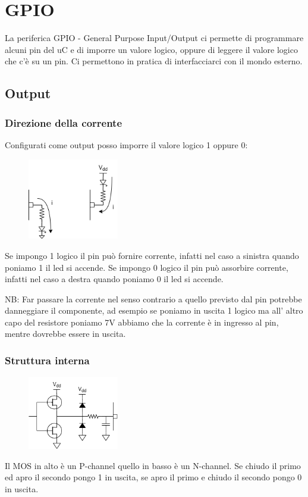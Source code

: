 \section{GPIO}
La periferica GPIO - General Purpose Input/Output ci permette di programmare alcuni pin del uC e di imporre un valore logico, oppure di leggere il valore logico che c'è su un pin.
Ci permettono in pratica di interfacciarci con il mondo esterno.

\subsection{Output}
\subsubsection{Direzione della corrente}
Configurati come output posso imporre il valore logico 1 oppure 0:
\begin{figure}[H]
    \centering
    \includegraphics[width=150px]{images/21_GPIO/gpio_output_current.png}
\end{figure}
Se impongo 1 logico il pin può fornire corrente, infatti nel caso a sinistra quando poniamo 1 il led si accende.
Se impongo 0 logico il pin può assorbire corrente, infatti nel caso a destra quando poniamo 0 il led si accende. 

NB: Far passare la corrente nel senso contrario a quello previsto dal pin potrebbe danneggiare il componente, ad esempio se poniamo in uscita 1 logico ma all' altro capo del resistore poniamo 7V abbiamo che la corrente è in ingresso al pin, mentre dovrebbe essere in uscita.

\subsubsection{Struttura interna}
\begin{figure}[H]
    \centering
    \includegraphics[width=150px]{images/21_GPIO/gpio_output_circuit.png}
\end{figure}
Il MOS in alto è un P-channel quello in basso è un N-channel.
Se chiudo il primo ed apro il secondo pongo 1 in uscita, se apro il primo e chiudo il secondo pongo 0 in uscita. 

